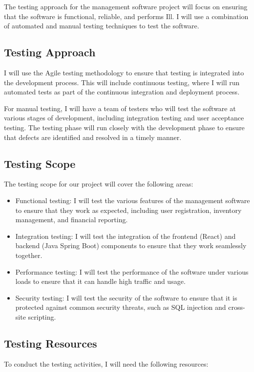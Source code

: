 \documentclass{article}
\begin{document}
The testing approach for the management software project will focus on ensuring that the software is functional, reliable, and performs Ill. I will use a combination of automated and manual testing techniques to test the software.

\subsection{Testing Approach}
I will use the Agile testing methodology to ensure that testing is integrated into the development process. This will include continuous testing, where I will run automated tests as part of the continuous integration and deployment process.

For manual testing, I will have a team of testers who will test the software at various stages of development, including integration testing and user acceptance testing. The testing phase will run closely with the development phase to ensure that defects are identified and resolved in a timely manner.

\subsection{Testing Scope}
The testing scope for our project will cover the following areas:

\begin{itemize}
\item Functional testing: I will test the various features of the management software to ensure that they work as expected, including user registration, inventory management, and financial reporting.
\item Integration testing: I will test the integration of the frontend (React) and backend (Java Spring Boot) components to ensure that they work seamlessly together.
\item Performance testing: I will test the performance of the software under various loads to ensure that it can handle high traffic and usage.
\item Security testing: I will test the security of the software to ensure that it is protected against common security threats, such as SQL injection and cross-site scripting.
\end{itemize}

\subsection{Testing Resources}
To conduct the testing activities, I will need the following resources:
\end{document}
